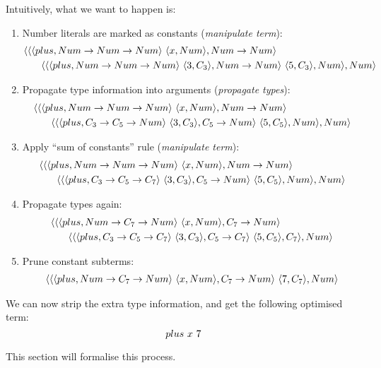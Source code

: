 \documentclass[main.tex]{subfiles}
\begin{document}
\begin{example}
    Intuitively, what we want to happen is:
    \begin{enumerate}
        \item Number literals are marked as constants (\emph{manipulate term}):
            \begin{align*}
                \langle \langle &\langle plus, Num \rightarrow Num \rightarrow Num \rangle \text{ }
                \langle x, Num \rangle, Num \rightarrow Num \rangle \text{ } \\
                        &\quad \langle \langle \langle plus, Num \rightarrow Num \rightarrow Num \rangle \text{ } \langle 3, C_3 \rangle, Num \rightarrow Num \rangle \text{ }
                        \langle 5, C_3 \rangle, Num \rangle, Num \rangle
            \end{align*}
        \item Propagate type information into arguments (\emph{propagate types}):
            \begin{align*}
                \langle \langle &\langle plus, Num \rightarrow Num \rightarrow Num \rangle \text{ }
                \langle x, Num \rangle, Num \rightarrow Num \rangle \text{ } \\
                        &\quad \langle \langle \langle plus, C_3 \rightarrow C_5 \rightarrow Num \rangle \text{ } \langle 3, C_3 \rangle, C_5 \rightarrow Num \rangle \text{ }
                        \langle 5, C_5 \rangle, Num \rangle, Num \rangle
            \end{align*}
        \item Apply ``sum of constants'' rule (\emph{manipulate term}):
            \begin{align*}
                \langle \langle &\langle plus, Num \rightarrow Num \rightarrow Num \rangle \text{ }
                \langle x, Num \rangle, Num \rightarrow Num \rangle \text{ } \\
                        &\quad \langle \langle \langle plus, C_3 \rightarrow C_5 \rightarrow C_7 \rangle \text{ } \langle 3, C_3 \rangle, C_5 \rightarrow Num \rangle \text{ }
                        \langle 5, C_5 \rangle, Num \rangle, Num \rangle
            \end{align*}
        \item Propagate types again:
            \begin{align*}
                \langle \langle &\langle plus, Num \rightarrow C_7 \rightarrow Num \rangle \text{ }
                \langle x, Num \rangle, C_7 \rightarrow Num \rangle \text{ } \\
                        &\quad \langle \langle \langle plus, C_3 \rightarrow C_5 \rightarrow C_7 \rangle \text{ } \langle 3, C_3 \rangle, C_5 \rightarrow C_7 \rangle \text{ }
                        \langle 5, C_5 \rangle, C_7 \rangle, Num \rangle
            \end{align*}
        \item Prune constant subterms:
            \begin{align*}
                \langle \langle &\langle plus, Num \rightarrow C_7 \rightarrow Num \rangle \text{ }
                \langle x, Num \rangle, C_7 \rightarrow Num \rangle \text{ }
                        \langle 7, C_7 \rangle, Num \rangle \\
            \end{align*}
    \end{enumerate}

    We can now strip the extra type information, and get the following
    optimised term:
    \[ plus \text{ } x \text{ } 7 \]

    This section will formalise this process.
\end{example}
\end{document}
